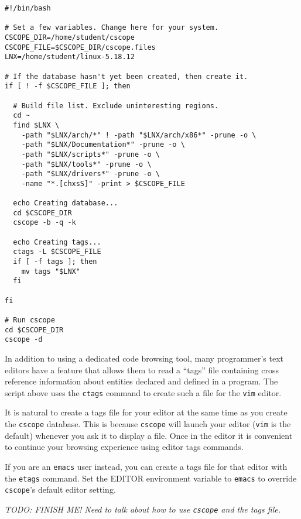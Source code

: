 \documentclass{article}
\newcommand{\command}[1]{\texttt{#1}}
\newcommand{\todo}[1]{\textit{TODO: #1}}
\begin{document}
\begin{verbatim}
#!/bin/bash

# Set a few variables. Change here for your system.
CSCOPE_DIR=/home/student/cscope
CSCOPE_FILE=$CSCOPE_DIR/cscope.files
LNX=/home/student/linux-5.18.12

# If the database hasn't yet been created, then create it.
if [ ! -f $CSCOPE_FILE ]; then

  # Build file list. Exclude uninteresting regions.
  cd ~
  find $LNX \
    -path "$LNX/arch/*" ! -path "$LNX/arch/x86*" -prune -o \
    -path "$LNX/Documentation*" -prune -o \
    -path "$LNX/scripts*" -prune -o \
    -path "$LNX/tools*" -prune -o \
    -path "$LNX/drivers*" -prune -o \
    -name "*.[chxsS]" -print > $CSCOPE_FILE

  echo Creating database...
  cd $CSCOPE_DIR
  cscope -b -q -k

  echo Creating tags...
  ctags -L $CSCOPE_FILE
  if [ -f tags ]; then
    mv tags "$LNX"
  fi

fi

# Run cscope
cd $CSCOPE_DIR
cscope -d
\end{verbatim}

In addition to using a dedicated code browsing tool, many programmer's text editors have a
feature that allows them to read a ``tags'' file containing cross reference information about
entities declared and defined in a program. The script above uses the \command{ctags} command to
create such a file for the \command{vim} editor.

It is natural to create a tags file for your editor at the same time as you create the
\command{cscope} database. This is because \command{cscope} will launch your editor
(\command{vim} is the default) whenever you ask it to display a file. Once in the editor it is
convenient to continue your browsing experience using editor tags commands.

If you are an \command{emacs} user instead, you can create a tags file for that editor with the
\command{etags} command. Set the EDITOR environment variable to \command{emacs} to override
\command{cscope}'s default editor setting.

\todo{FINISH ME! Need to talk about how to use \command{cscope} and the tags file.}
\end{document}
